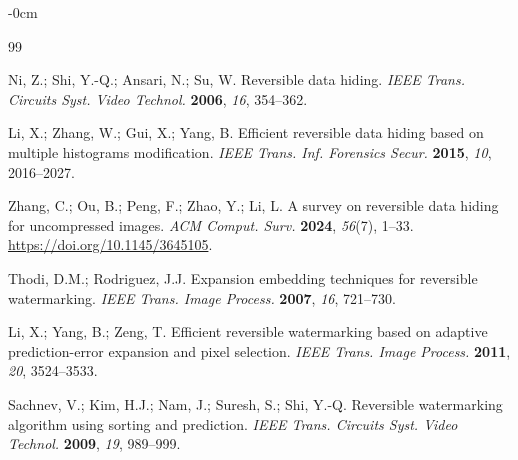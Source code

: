 \documentclass[journal,article,submit,pdftex,moreauthors]{Definitions/mdpi}
\begin{document}
\begin{adjustwidth}{-\extralength}{0cm}



% 


\begin{thebibliography}{99}

Ni, Z.; Shi, Y.-Q.; Ansari, N.; Su, W.
Reversible data hiding.
\emph{IEEE Trans. Circuits Syst. Video Technol.} \textbf{2006}, \emph{16}, 354--362.

Li, X.; Zhang, W.; Gui, X.; Yang, B.
Efficient reversible data hiding based on multiple histograms modification.
\emph{IEEE Trans. Inf. Forensics Secur.} \textbf{2015}, \emph{10}, 2016--2027.

Zhang, C.; Ou, B.; Peng, F.; Zhao, Y.; Li, L.
A survey on reversible data hiding for uncompressed images.
\emph{ACM Comput. Surv.} \textbf{2024}, \emph{56}(7), 1--33. \url{https://doi.org/10.1145/3645105}.

Thodi, D.M.; Rodriguez, J.J.
Expansion embedding techniques for reversible watermarking.
\emph{IEEE Trans. Image Process.} \textbf{2007}, \emph{16}, 721--730.

Li, X.; Yang, B.; Zeng, T.
Efficient reversible watermarking based on adaptive prediction-error expansion and pixel selection.
\emph{IEEE Trans. Image Process.} \textbf{2011}, \emph{20}, 3524--3533.

Sachnev, V.; Kim, H.J.; Nam, J.; Suresh, S.; Shi, Y.-Q.
Reversible watermarking algorithm using sorting and prediction.
\emph{IEEE Trans. Circuits Syst. Video Technol.} \textbf{2009}, \emph{19}, 989--999.


\end{thebibliography}
\end{adjustwidth}
\end{document}
